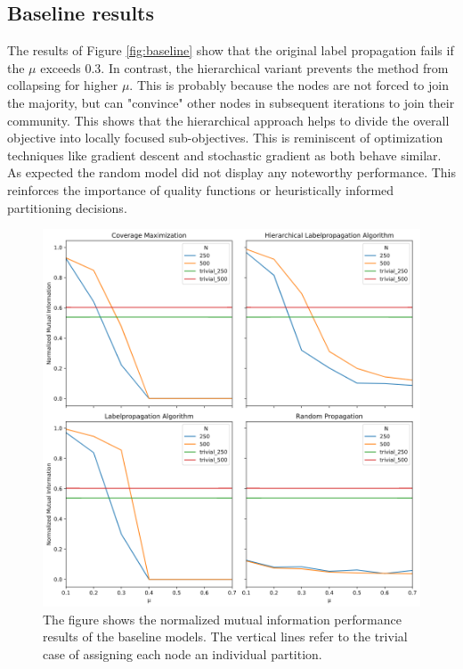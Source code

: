 \documentclass[11pt, twocolumn]{article}
\begin{document}
\subsection{Baseline results}
The results of Figure \autoref{fig:baseline} show that the original label propagation fails if the $\mu$ exceeds 0.3. In contrast, the hierarchical variant prevents the method from collapsing for higher $\mu$. This is probably because the nodes are not forced to join the majority, but can "convince" other nodes in subsequent iterations to join their community. This shows that the hierarchical approach helps to divide the overall objective into locally focused sub-objectives. This is reminiscent of optimization techniques like gradient descent and stochastic gradient as both behave similar. As expected the random model did not display any noteworthy performance. This reinforces the importance of quality functions or heuristically informed partitioning decisions. 

\begin{figure}[h]
  \includegraphics[width=\linewidth]{baselines.png}
  \caption{The figure shows the normalized mutual information performance results of the baseline models. The vertical lines refer to the trivial case of assigning each node an individual partition.}
  \label{fig:baseline}
\end{figure}
\end{document}
